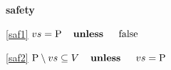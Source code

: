 \textbf{safety}
\begin{block}
\item[ \eqref{saf1} ]{$vs = \text{P} \textbf{\quad unless \quad} \text{false}$} %
\item[ \eqref{saf2} ]{$\text{P} \setminus vs \subseteq V \textbf{\quad unless \quad} vs = \text{P}$} %
\end{block}
